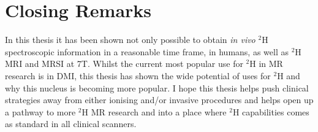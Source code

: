 \section{Closing Remarks}

In this thesis it has been shown not only possible to obtain \textit{in vivo} $^2$H spectroscopic information in a reasonable time frame, in humans, as well as $^2$H \ac{MRI} and \ac{MRSI} at 7T. Whilst the current most popular use for $^2$H in MR research is in \ac{DMI}, this thesis has shown the wide potential of uses for $^2$H and why this nucleus is becoming more popular. I hope this thesis helps push clinical strategies away from either ionising and/or invasive procedures and helps open up a pathway to more $^2$H MR research and into a place where $^2$H capabilities comes as standard in all clinical scanners.